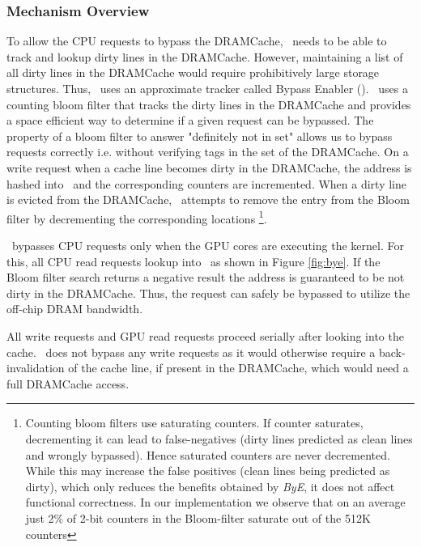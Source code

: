 \subsubsection{Mechanism Overview}
\par To allow the CPU requests to bypass the DRAMCache, \cachename\ needs to be able to track and lookup dirty lines in the DRAMCache. However, maintaining a list of all dirty lines in the DRAMCache would require prohibitively large storage structures. Thus, \cachename\ uses an approximate tracker called Bypass Enabler (\bypassname). \bypassname\ uses a counting bloom filter \cite{bloom,counting-bloom} that tracks the dirty lines in the DRAMCache and provides a space efficient way to determine if a given request can be bypassed. The property of a bloom filter to answer "definitely not in set" allows us to bypass requests correctly i.e. without verifying tags in the set of the DRAMCache. 
On a write request when a cache line becomes dirty in the DRAMCache, the address is hashed into \bypassname\ and the corresponding counters are incremented. When a dirty line is evicted from the DRAMCache, \bypassname\ attempts to remove the entry from the Bloom filter by decrementing the corresponding locations 
\footnote{Counting bloom filters use saturating counters. If counter saturates, decrementing it can lead to false-negatives (dirty lines predicted as clean lines and wrongly bypassed). Hence saturated counters are never decremented.  While this may increase the false positives (clean lines being predicted as dirty), which only reduces the benefits obtained by \textit{ByE}, it does not affect functional correctness. In our implementation we observe that on an average just 2\% of 2-bit counters in the Bloom-filter saturate out of the 512K counters}.
\par \bypassname\ bypasses CPU requests only when the GPU cores are executing the kernel. For this, all CPU read requests lookup into \bypassname\ as shown in Figure \ref{fig:bye}. If the Bloom filter search returns a  negative result the address is guaranteed to be not dirty in the DRAMCache. Thus, the request can safely be bypassed to utilize the off-chip DRAM bandwidth. 
\par All write requests and GPU read requests proceed serially after looking into the cache. \bypassname\ does not bypass any write requests as it would otherwise require a back-invalidation of the cache line, if present in the DRAMCache, which would need a full DRAMCache access.

